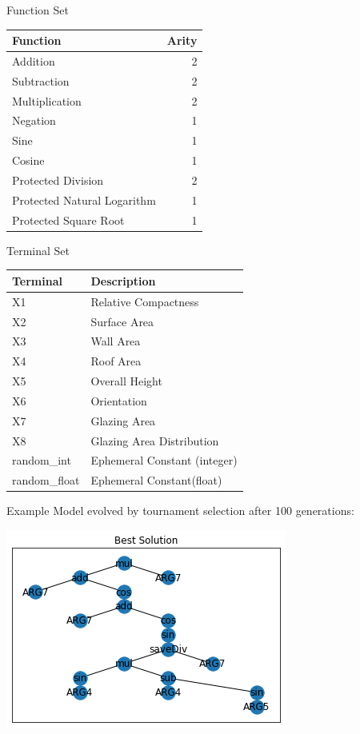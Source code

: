 \documentclass[
  ignorenonframetext,
]{beamer}
\begin{document}
\begin{frame}{Function Set}
\protect\hypertarget{function-set}{}
\begin{tabular}{l|r}
\hline
Function & Arity\\
\hline
Addition & 2\\
\hline
Subtraction & 2\\
\hline
Multiplication & 2\\
\hline
Negation & 1\\
\hline
Sine & 1\\
\hline
Cosine & 1\\
\hline
Protected Division & 2\\
\hline
Protected Natural Logarithm & 1\\
\hline
Protected Square Root & 1\\
\hline
\end{tabular}
\end{frame}

\begin{frame}{Terminal Set}
\protect\hypertarget{terminal-set}{}
\begin{tabular}{l|l}
\hline
Terminal & Description\\
\hline
X1 & Relative Compactness\\
\hline
X2 & Surface Area\\
\hline
X3 & Wall Area\\
\hline
X4 & Roof Area\\
\hline
X5 & Overall Height\\
\hline
X6 & Orientation\\
\hline
X7 & Glazing Area\\
\hline
X8 & Glazing Area Distribution\\
\hline
random\_int & Ephemeral Constant (integer)\\
\hline
random\_float & Ephemeral Constant(float)\\
\hline
\end{tabular}
\end{frame}

\begin{frame}{Example}
\protect\hypertarget{example}{}
Model evolved by tournament selection after 100 generations:

\includegraphics{../plots/example_model.png}
\end{frame}
\end{document}
